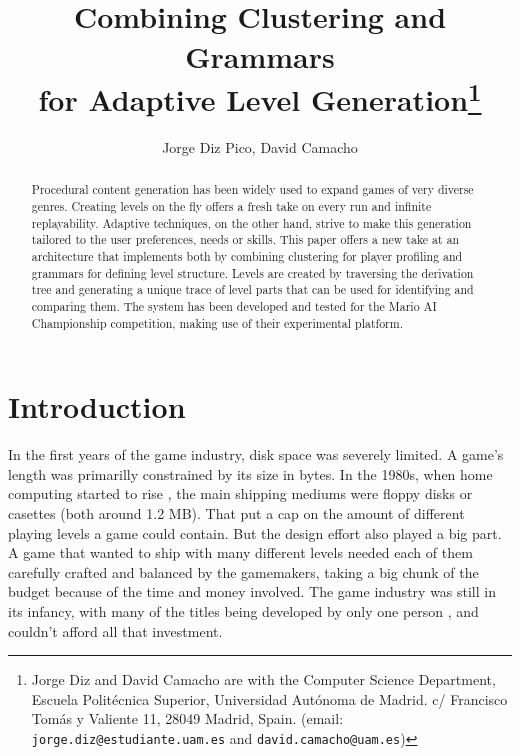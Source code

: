 \documentclass[conference]{IEEEtran}
\begin{document}
	
	\lstset{basicstyle=\ttfamily, frame=shadowbox}

\title{\ \\ \LARGE\bf Combining Clustering and Grammars \\ for Adaptive Level Generation\thanks{Jorge Diz and David Camacho are with the Computer Science Department, Escuela Politécnica Superior, Universidad Autónoma de Madrid. c/ Francisco Tomás y Valiente 11, 28049 Madrid, Spain. (email: {\tt jorge.diz@estudiante.uam.es} and {\tt david.camacho@uam.es})}}

\author{Jorge Diz Pico, David Camacho}


\maketitle

\begin{abstract}
	
	Procedural content generation has been widely used to expand games
	of very diverse genres. Creating levels on the fly offers a fresh
	take on every run and infinite replayability. Adaptive techniques,
	on the other hand, strive to make this generation tailored to the user
	preferences, needs or skills. This paper offers a new take at
	an architecture that implements both by combining clustering
	for player profiling and grammars for defining level structure.
	Levels are created by traversing the derivation tree and
	generating a unique trace of level parts that can be
	used for identifying and comparing them. The system has
	been developed and tested for the Mario AI Championship competition,
	making use of their experimental platform.

\end{abstract}




\section{Introduction}

In the first years of the game industry, disk space was severely limited. A game's length was primarilly constrained by its size in bytes. In the 1980s, when home computing started to rise \cite{shah05}, the main shipping mediums were floppy disks or casettes (both around 1.2 MB). That put a cap on the amount of different playing levels a game could contain. But the design effort also played a big part. A game that wanted to ship with many different levels needed each of them carefully crafted and balanced by the gamemakers, taking a big chunk of the budget because of the time and money involved. The game industry was still in its infancy, with many of the titles being developed by only one person \cite{discovery}, and couldn't afford all that investment.
\end{document}

